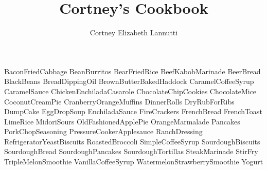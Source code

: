 \documentclass[a4paper, titlepage]{book}
\title{Cortney's Cookbook}
\author{Cortney Elizabeth Lannutti}
\date{}
\begin{document}
\maketitle
{}
\tableofcontents
\newpage
{}

{BaconFriedCabbage}
{BeanBurritos}
{BearFriedRice}
{BeefKabobMarinade}
{BeerBread}
{BlackBeans}
{BreadDippingOil}
{BrownButterBakedHaddock}
{CaramelCoffeeSyrup}
{CaramelSauce}
{ChickenEnchiladaCasarole}
{ChocolateChipCookies}
{ChocolateMice}
{CoconutCreamPie}
{CranberryOrangeMuffins}
{DinnerRolls}
{DryRubForRibs}
{DumpCake}
{EggDropSoup}
{EnchiladaSauce}
{FireCrackers}
{FrenchBread}
{FrenchToast}
{LimeRice}
{MidoriSours}
{OldFashionedApplePie}
{OrangeMarmalade}
{Pancakes}
{PorkChopSeasoning}
{PressureCookerApplesauce}
{RanchDressing}
{RefrigeratorYeastBiscuits}
{RoastedBroccoli}
{SimpleCoffeeSyrup}
{SourdoughBiscuits}
{SourdoughBread}
{SourdoughPancakes}
{SourdoughTortillas}
{SteakMarinade}
{StirFry}
{TripleMelonSmoothie}
{VanillaCoffeeSyrup}
{WatermelonStrawberrySmoothie}
{Yogurt}
\end{document}
